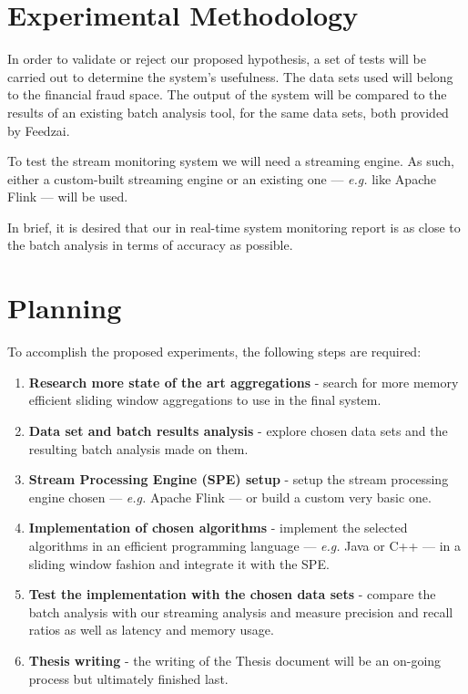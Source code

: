 \section{Experimental Methodology}

In order to validate or reject our proposed hypothesis, a set of tests will be carried out to determine the system's usefulness. The data sets used will belong to the financial fraud space. The output of the system will be compared to the results of an existing batch analysis tool, for the same data sets, both provided by Feedzai.

To test the stream monitoring system we will need a streaming engine. As such, either a custom-built streaming engine or an existing one --- \textit{e.g.} like Apache Flink \cite{Rabl-Apache-Flink} --- will be used. 

In brief, it is desired that our in real-time system monitoring report is as close to the batch analysis in terms of accuracy as possible.


\section{Planning}
To accomplish the proposed experiments, the following steps are required:

\begin{enumerate}[start=1, label={\textbf{T\arabic*:}}]
    \item \textbf{Research more state of the art aggregations} - search for more memory efficient sliding window aggregations to use in the final system.
    
    \item \textbf{Data set and batch results analysis} - explore chosen data sets and the resulting batch analysis made on them.
    
    \item \textbf{Stream Processing Engine (SPE) setup} - setup the stream processing engine chosen --- \textit{e.g.} Apache Flink \cite{Rabl-Apache-Flink} --- or build a custom very basic one.
    
    \item \textbf{Implementation of chosen algorithms} - implement the selected algorithms in an efficient programming language --- \textit{e.g.} Java or C++ --- in a sliding window fashion and integrate it with the SPE.
    
    \item \textbf{Test the implementation with the chosen data sets} - compare the batch analysis with our streaming analysis and measure precision and recall ratios as well as latency and memory usage.
    
    \item \textbf{Thesis writing} - the writing of the Thesis document will be an on-going process but ultimately finished last.
\end{enumerate}

